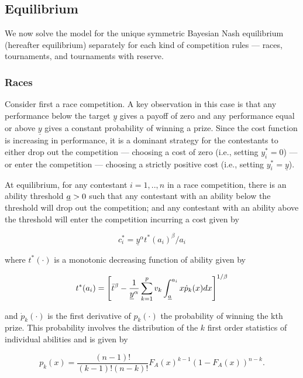 \documentclass[11pt, titlepage]{article}
\newcommand\deadline{\bar{t}}
\newcommand\target{\underline{y}}
\begin{document}
\subsection{Equilibrium}\label{equilibrium}

We now solve the model for the unique symmetric Bayesian Nash
equilibrium (hereafter equilibrium) separately for each kind of
competition rules --- races, tournaments, and tournaments with reserve.

\subsubsection{Races}\label{races}

Consider first a race competition. A key observation in this case is
that any performance below the target \(\target\) gives a payoff of zero
and any performance equal or above \(\target\) gives a constant
probability of winning a prize. Since the cost function is increasing in
performance, it is a dominant strategy for the contestants to either
drop out the competition --- choosing a cost of zero (i.e., setting
\(y_i^*=0\)) --- or enter the competition --- choosing a strictly
positive cost (i.e., setting \(y_i^*=\target\)).

At equilibrium, for any contestant \(i=1, .., n\) in a race competition,
there is an ability threshold \(\underline{a}>0\) such that any contestant
with an ability below the threshold will drop out the competition; and
any contestant with an ability above the threshold will enter the
competition incurring a cost given by

\begin{equation}
    \label{cost races}
    c_i^* = \target^\alpha t^*(a_i)^\beta / a_i
\end{equation}

where \(t^*(\cdot)\) is a monotonic decreasing function of ability given
by

\begin{equation}
        t^*(a_i) = \left[
            \deadline^\beta - \frac{1}{\target^\alpha}\sum_{k=1}^{p} v_k \int_{\marginal}^{a_i} x \dot p_k(x) d x
        \right]^{1/\beta}
\end{equation}

and \(\dot p_k(\cdot)\) is the first derivative of \(p_k(\cdot)\) the
probability of winning the kth prize. This probability involves the
distribution of the \(k\) first order statistics of individual abilities
and is given by

\[
    p_k(x) = \frac{(n-1)!}{(k-1)!(n-k)!} F_A(x)^{k-1} (1-F_A(x))^{n-k}. 
\]
\end{document}
